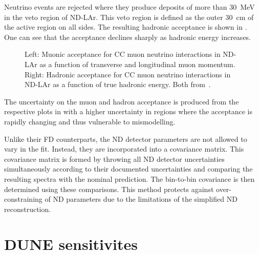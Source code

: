 Neutrino events are rejected where they produce deposits of more than \SI{30}{\MeV} in the veto region of ND-LAr.
This veto region is defined as the outer \SI{30}{\cm} of the active region on all sides.
The resulting hadronic acceptance is shown in .
One can see that the acceptance declines sharply as hadronic energy increases.

\begin{figure}[h]
	\begin{minipage}[t]{.5\textwidth}
		\begin{adjustbox}{max totalsize=\linewidth, center}
			
		\end{adjustbox}
	\end{minipage}
	\hfill
	\begin{minipage}[t]{.5\textwidth}
		\begin{adjustbox}{max totalsize=\linewidth, center}
			
		\end{adjustbox}
	\end{minipage}
	\caption[Muonic and hadronic acceptance for CC neutrino interactions in ND-LAr]{Left: Muonic acceptance for CC muon neutrino interactions in ND-LAr as a function of transverse and longitudinal muon momentum. Right: Hadronic acceptance for CC muon neutrino interactions in ND-LAr as a function of true hadronic energy. Both from~\cite{Abi:2020qib}.}
	\label{fig:ndAcceptance}
\end{figure}

The uncertainty on the muon and hadron acceptance is produced from the respective plots in  with a higher uncertainty in regions where the acceptance is rapidly changing and thus vulnerable to mismodelling.

Unlike their FD counterparts, the ND detector parameters are not allowed to vary in the fit.
Instead, they are incorporated into a covariance matrix.
This covariance matrix is formed by throwing all ND detector uncertainties simultaneously according to their documented uncertainties and comparing the resulting spectra with the nominal prediction.
The bin-to-bin covariance is then determined using these comparisons.
This method protects against over-constraining of ND parameters due to the limitations of the simplified ND reconstruction.

\section{DUNE sensitivites}
\label{sec:dune_lbl:sensitivities}

